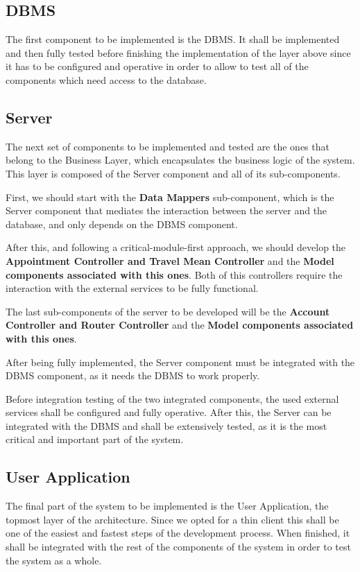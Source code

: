 \documentclass[12pt]{article}
\begin{document}
\subsection{DBMS}
The first component to be implemented is the DBMS. It shall be implemented and then fully tested before finishing the implementation of the layer above since it has to be configured and operative in order to allow to test all of the components which need access to the database.
    
\subsection{Server}
The next set of components to be implemented and tested are the ones that belong to the Business Layer, which encapsulates the business logic of the system. This layer is composed of the Server component and all of its sub-components. 

First, we should start with the \textbf{Data Mappers} sub-component, which is the Server component that mediates the interaction between the server and the database, and only depends on the DBMS component.

After this, and following a critical-module-first approach, we should develop the \textbf{Appointment Controller and Travel Mean Controller} and the \textbf{Model components associated with this ones}. Both of this controllers require the interaction with the external services to be fully functional.

The last sub-components of the server to be developed will be the \textbf{Account Controller and Router Controller} and the \textbf{Model components associated with this ones}.

After being fully implemented, the Server component must be integrated with the DBMS component, as it needs the DBMS to work properly.

Before integration testing of the two integrated components, the used external services shall be configured and fully operative.
After this, the Server can be integrated with the DBMS and shall be extensively tested, as it is the most critical and important part of the system.

\subsection{User Application}
The final part of the system to be implemented is the User Application, the topmost layer of the architecture. Since we opted for a thin client this shall be one of the easiest and fastest steps of the development process.
When finished, it shall be integrated with the rest of the components of the system in order to test the system as a whole.
\end{document}
